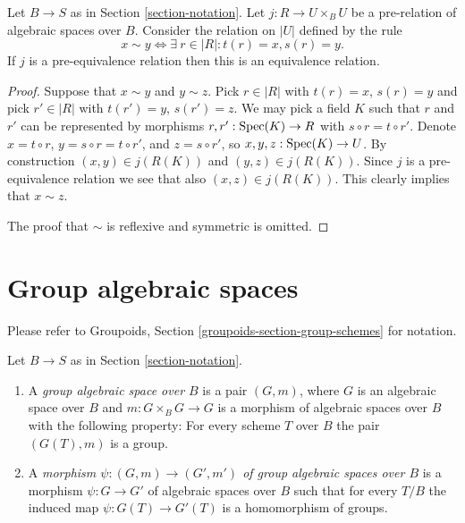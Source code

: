 \begin{lemma}
\label{lemma-pre-equivalence-equivalence-relation-points}
Let $B \to S$ as in Section \ref{section-notation}.
Let $j : R \to U \times_B U$ be a pre-relation of algebraic spaces over $B$.
Consider the relation on $|U|$ defined by the rule
$$
x \sim y
\Leftrightarrow
\exists\ r \in |R| :
t(r) = x,
s(r) = y.
$$
If $j$ is a pre-equivalence relation then this is an equivalence relation.
\end{lemma}

\begin{proof}
Suppose that $x \sim y$ and $y \sim z$.
Pick $r \in |R|$ with $t(r) = x$, $s(r) = y$ and
pick $r' \in |R|$ with $t(r') = y$, $s(r') = z$.
We may pick a field $K$ such that $r$ and $r'$ can be
represented by morphisms $r, r' : \mathop{\rm Spec}(K) \to R$
with $s \circ r = t \circ r'$.
Denote $x = t \circ r$, $y = s \circ r = t \circ r'$,
and $z = s \circ r'$, so $x,y,z : \mathop{\rm Spec}(K) \to U$.
By construction $(x, y) \in j(R(K))$ and
$(y, z) \in j(R(K))$. Since $j$ is a pre-equivalence relation
we see that also $(x, z) \in j(R(K))$.
This clearly implies that $x \sim z$.

\medskip\noindent
The proof that $\sim$ is reflexive and symmetric is omitted.
\end{proof}















\section{Group algebraic spaces}
\label{section-group-spaces}

\noindent
Please refer to
Groupoids, Section \ref{groupoids-section-group-schemes}
for notation.

\begin{definition}
\label{definition-group-space}
Let $B \to S$ as in Section \ref{section-notation}.
\begin{enumerate}
\item A {\it group algebraic space over $B$} is a pair $(G, m)$, where
$G$ is an algebraic space over $B$ and $m : G \times_B G \to G$ is
a morphism of algebraic spaces over $B$ with the following property:
For every scheme $T$ over $B$ the pair $(G(T), m)$ is a group.
\item A {\it morphism $\psi : (G, m) \to (G', m')$ of
group algebraic spaces over $B$}
is a morphism $\psi : G \to G'$ of algebraic spaces over $B$ such that for
every $T/B$ the induced map $\psi : G(T) \to G'(T)$ is a homomorphism
of groups.
\end{enumerate}
\end{definition}

